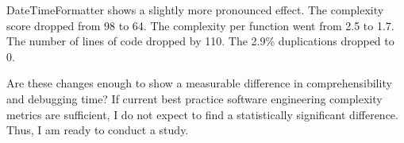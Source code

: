 DateTimeFormatter shows a slightly more pronounced effect. The complexity score dropped from 98 to 64. The complexity per function went from 2.5 to 1.7. The number of lines of code dropped by 110. The 2.9\% duplications dropped to 0.

Are these changes enough to show a measurable difference in comprehensibility and debugging time? If current best practice software engineering complexity metrics are sufficient, I do not expect to find a statistically significant difference. Thus, I am ready to conduct a study. 
